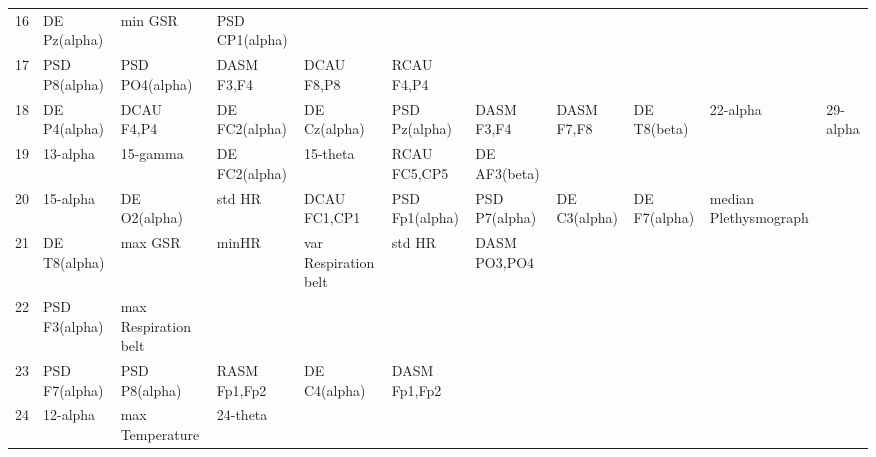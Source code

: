 \begin{landscape}
\begin{table}[]
\begin{tabular}{l|llllllll}
16       & DE Pz(alpha)          & min GSR               & PSD CP1(alpha)       &                         &                         &                      &                      &                       &                       &                    \\
17       & PSD P8(alpha)         & PSD PO4(alpha)        & DASM F3,F4           & DCAU F8,P8              & RCAU F4,P4              &                      &                      &                       &                       &                    \\
18       & DE P4(alpha)          & DCAU F4,P4            & DE FC2(alpha)        & DE Cz(alpha)            & PSD Pz(alpha)           & DASM F3,F4           & DASM F7,F8           & DE T8(beta)           & 22-alpha              & 29-alpha           \\
19       & 13-alpha              & 15-gamma              & DE FC2(alpha)        & 15-theta                & RCAU FC5,CP5            & DE AF3(beta)         &                      &                       &                       &                    \\
20       & 15-alpha              & DE O2(alpha)          & std HR               & DCAU FC1,CP1            & PSD Fp1(alpha)          & PSD P7(alpha)        & DE C3(alpha)         & DE F7(alpha)          & median Plethysmograph &                    \\
21       & DE T8(alpha)          & max GSR               & minHR                & var Respiration belt    & std HR                  & DASM PO3,PO4         &                      &                       &                       &                    \\
22       & PSD F3(alpha)         & max Respiration belt  &                      &                         &                         &                      &                      &                       &                       &                    \\
23       & PSD F7(alpha)         & PSD P8(alpha)         & RASM Fp1,Fp2         & DE C4(alpha)            & DASM Fp1,Fp2            &                      &                      &                       &                       &                    \\
24       & 12-alpha              & max Temperature       & 24-theta             &                         &                         &                      &                      &                       &                       &                    \\

\end{tabular}
\end{table}
\end{landscape}
